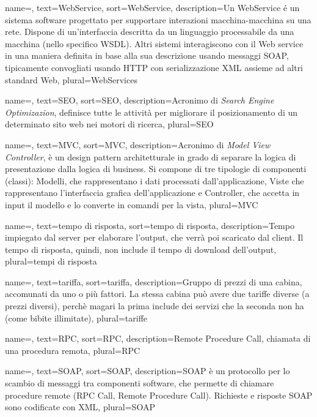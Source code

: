 {
	name=,
	text=WebService,
	sort=WebService,
	description={Un WebService é un sistema software progettato per supportare interazioni macchina-macchina su una rete. Dispone di un'interfaccia descritta da un linguaggio processabile da una macchina (nello specifico WSDL). Altri sistemi interagiscono con il Web service in una maniera definita in base alla sua descrizione usando messaggi SOAP, tipicamente convogliati usando HTTP con serializzazione XML assieme ad altri standard Web\cite{site:webservice}},
	plural=WebServices
}


{
	name=,
	text=SEO,
	sort=SEO,
	description={Acronimo di \textit{Search Engine Optimizazion}, definisce tutte le attività per migliorare il posizionamento di un determinato sito web nei motori di ricerca\cite{site:seo}},
	plural=SEO
}


{
	name=,
	text=MVC,
	sort=MVC,
	description={Acronimo di \textit{Model View Controller}, è un design pattern architetturale in grado di separare la logica di presentazione dalla logica di business. Si compone di tre tipologie di componenti (classi): Modelli, che rappresentano i dati processati dall'applicazione, Viste che rappresentano l'interfaccia grafica dell'applicazione e Controller, che accetta in input il modello e lo converte in comandi per la vista\cite{book:mvc}},
	plural=MVC
}


{
	name=,
	text=tempo di risposta,
	sort=tempo di risposta,
	description={Tempo impiegato dal server per elaborare l'output, che verrà poi scaricato dal client. Il tempo di risposta, quindi, non include il tempo di download dell'output},
	plural=tempi di risposta
}

{
	name=,
	text=tariffa,
	sort=tariffa,
	description={Gruppo di prezzi di una cabina, accomunati da uno o più fattori. La stessa cabina può avere due tariffe diverse (a prezzi diversi), perchè magari la prima include dei servizi che la seconda non ha (come bibite illimitate)},
	plural=tariffe
}

{
	name=,
	text=RPC,
	sort=RPC,
	description={Remote Procedure Call, chiamata di una procedura remota\cite{site:rpc}},
	plural=RPC
}

{
	name=,
	text=SOAP,
	sort=SOAP,
	description={SOAP è un protocollo per lo scambio di messaggi tra componenti software, che permette di chiamare procedure remote (RPC Call, Remote Procedure Call). Richieste e risposte SOAP sono codificate con XML\cite{site:soap}},
	plural=SOAP
}

